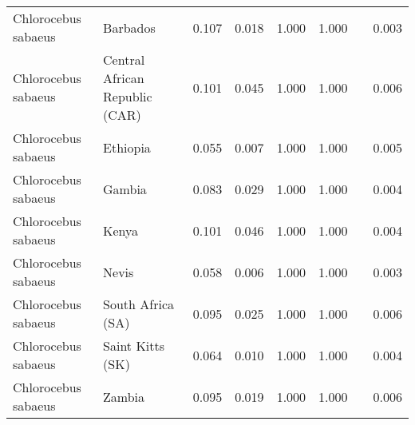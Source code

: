 \begin{center}
\begin{adjustbox}{width = 1\textwidth}
\begin{tabular}{|l|l|r|r|r|r|r|}
 Chlorocebus sabaeus &                        Barbados &                                              0.107 &                                              0.018 &                1.000 &                                  1.000~~ &              0.003 \\
 Chlorocebus sabaeus &  Central African Republic (CAR) &                                              0.101 &                                              0.045 &                1.000 &                                  1.000~~ &              0.006 \\
 Chlorocebus sabaeus &                        Ethiopia &                                              0.055 &                                              0.007 &                1.000 &                                  1.000~~ &              0.005 \\
 Chlorocebus sabaeus &                          Gambia &                                              0.083 &                                              0.029 &                1.000 &                                  1.000~~ &              0.004 \\
 Chlorocebus sabaeus &                           Kenya &                                              0.101 &                                              0.046 &                1.000 &                                  1.000~~ &              0.004 \\
 Chlorocebus sabaeus &                           Nevis &                                              0.058 &                                              0.006 &                1.000 &                                  1.000~~ &              0.003 \\
 Chlorocebus sabaeus &               South Africa (SA) &                                              0.095 &                                              0.025 &                1.000 &                                  1.000~~ &              0.006 \\
 Chlorocebus sabaeus &                Saint Kitts (SK) &                                              0.064 &                                              0.010 &                1.000 &                                  1.000~~ &              0.004 \\
 Chlorocebus sabaeus &                          Zambia &                                              0.095 &                                              0.019 &                1.000 &                                  1.000~~ &              0.006 \\

\end{tabular}
\end{adjustbox}
\end{center}
